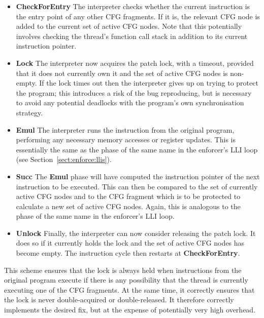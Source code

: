 \begin{itemize}
\item \textbf{CheckForEntry} The interpreter checks whether the
  current instruction is the entry point of any other CFG fragments.
  If it is, the relevant CFG node is added to the current set of
  active CFG nodes.  Note that this potentially involves checking the
  thread's function call stack in addition to its current instruction
  pointer.

\item \textbf{Lock} The interpreter now acquires the patch lock, with
  a timeout, provided that it does not currently own it and the set of
  active CFG nodes is non-empty.  If the lock times out then the
  interpreter gives up on trying to protect the program; this
  introduces a risk of the bug reproducing, but is necessary to avoid
  any potential deadlocks with the program's own synchronisation
  strategy.

\item \textbf{Emul} The interpreter runs the instruction from the
  original program, performing any necessary memory accesses or
  register updates.  This is essentially the same as the phase of the
  same name in the enforcer's LLI loop (see
  Section~\ref{sect:enforce:llis}).

\item \textbf{Succ} The \textbf{Emul} phase will have computed the
  instruction pointer of the next instruction to be executed.  This
  can then be compared to the set of currently active CFG nodes and to
  the CFG fragment which is to be protected to calculate a new set of
  active CFG nodes.  Again, this is analogous to the phase of the same
  name in the enforcer's LLI loop.

\item \textbf{Unlock} Finally, the interpreter can now consider
  releasing the patch lock.  It does so if it currently holds the lock
  and the set of active CFG nodes has become empty.  The instruction
  cycle then restarts at \textbf{CheckForEntry}.
\end{itemize}

This scheme ensures that the lock is always held when instructions
from the original program execute if there is any possibility that the
thread is currently executing one of the CFG fragments.  At the same
time, it correctly ensures that the lock is never double-acquired or
double-released.  It therefore correctly implements the desired fix,
but at the expense of potentially very high overhead.

